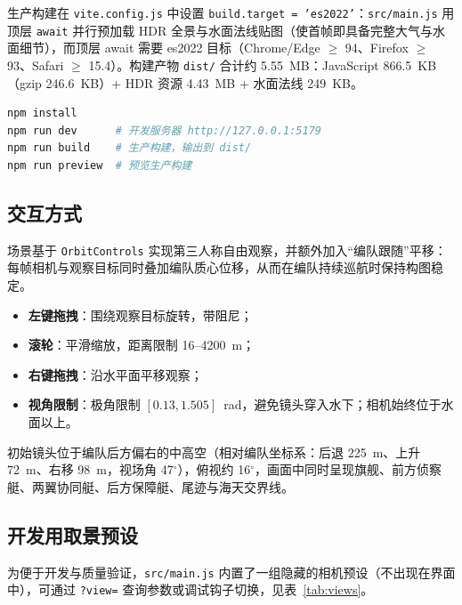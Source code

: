 \documentclass[UTF8, a4paper, 11pt]{ctexart}
\newcommand{\file}[1]{\texttt{#1}}
\begin{document}
生产构建在 \file{vite.config.js} 中设置 \texttt{build.target = 'es2022'}：\file{src/main.js} 用顶层 \texttt{await} 并行预加载 HDR 全景与水面法线贴图（使首帧即具备完整大气与水面细节），而顶层 await 需要 es2022 目标（Chrome/Edge $\ge$ 94、Firefox $\ge$ 93、Safari $\ge$ 15.4）。构建产物 \file{dist/} 合计约 5.55~MB：JavaScript 866.5~KB（gzip 246.6~KB）+ HDR 资源 4.43~MB + 水面法线 249~KB。

\begin{lstlisting}[language=bash, caption={安装与运行命令}, label={lst:run}]
npm install
npm run dev      # 开发服务器 http://127.0.0.1:5179
npm run build    # 生产构建，输出到 dist/
npm run preview  # 预览生产构建
\end{lstlisting}

\subsection{交互方式}

场景基于 \texttt{OrbitControls} 实现第三人称自由观察，并额外加入“编队跟随”平移：每帧相机与观察目标同时叠加编队质心位移，从而在编队持续巡航时保持构图稳定。

\begin{itemize}
  \item \textbf{左键拖拽}：围绕观察目标旋转，带阻尼；
  \item \textbf{滚轮}：平滑缩放，距离限制 16--4200~m；
  \item \textbf{右键拖拽}：沿水平面平移观察；
  \item \textbf{视角限制}：极角限制 $[0.13, 1.505]$~rad，避免镜头穿入水下；相机始终位于水面以上。
\end{itemize}

初始镜头位于编队后方偏右的中高空（相对编队坐标系：后退 225~m、上升 72~m、右移 98~m，视场角 47$^\circ$），俯视约 16$^\circ$，画面中同时呈现旗舰、前方侦察艇、两翼协同艇、后方保障艇、尾迹与海天交界线。

\subsection{开发用取景预设}

为便于开发与质量验证，\file{src/main.js} 内置了一组隐藏的相机预设（不出现在界面中），可通过 \file{?view=} 查询参数或调试钩子切换，见表~\ref{tab:views}。
\end{document}

